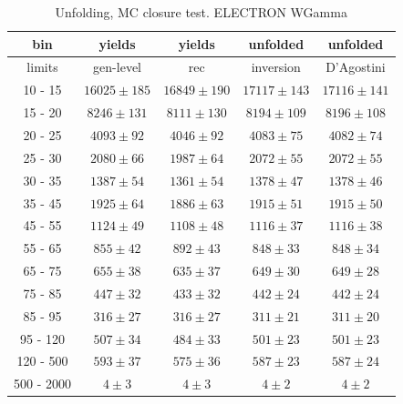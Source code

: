 \begin{table}[h]
  \scriptsize
  \begin{center}
  \caption{Unfolding, MC closure test. ELECTRON WGamma}
  \begin{tabular}{|c|c|c|c|c|}
  bin &  yields &   yields &  unfolded &  unfolded \\ \hline
   limits &  gen-level & rec &  inversion &  D'Agostini \\ \hline
 10 -  15 &     $16025\pm 185$ &     $16849\pm 190$ &     $17117\pm143$ &     $17116\pm141$ \\ \hline
 15 -  20 &     $8246\pm 131$ &     $8111\pm 130$ &     $8194\pm109$ &     $8196\pm108$ \\ \hline
 20 -  25 &     $4093\pm  92$ &     $4046\pm  92$ &     $4083\pm75$ &     $4082\pm74$ \\ \hline
 25 -  30 &     $2080\pm  66$ &     $1987\pm  64$ &     $2072\pm55$ &     $2072\pm55$ \\ \hline
 30 -  35 &     $1387\pm  54$ &     $1361\pm  54$ &     $1378\pm47$ &     $1378\pm46$ \\ \hline
 35 -  45 &     $1925\pm  64$ &     $1886\pm  63$ &     $1915\pm51$ &     $1915\pm50$ \\ \hline
 45 -  55 &     $1124\pm  49$ &     $1108\pm  48$ &     $1116\pm37$ &     $1116\pm38$ \\ \hline
 55 -  65 &     $855\pm  42$ &     $892\pm  43$ &     $848\pm33$ &     $848\pm34$ \\ \hline
 65 -  75 &     $655\pm  38$ &     $635\pm  37$ &     $649\pm30$ &     $649\pm28$ \\ \hline
 75 -  85 &     $447\pm  32$ &     $433\pm  32$ &     $442\pm24$ &     $442\pm24$ \\ \hline
 85 -  95 &     $316\pm  27$ &     $316\pm  27$ &     $311\pm21$ &     $311\pm20$ \\ \hline
 95 - 120 &     $507\pm  34$ &     $484\pm  33$ &     $501\pm23$ &     $501\pm23$ \\ \hline
120 - 500 &     $593\pm  37$ &     $575\pm  36$ &     $587\pm23$ &     $587\pm24$ \\ \hline
500 - 2000 &     $4\pm   3$ &     $4\pm   3$ &     $4\pm2$ &     $4\pm2$ \\ \hline
  \end{tabular}
  \label{tab:unf_mc_closure_ELECTRON_WGamma}
  \end{center}
\end{table}


